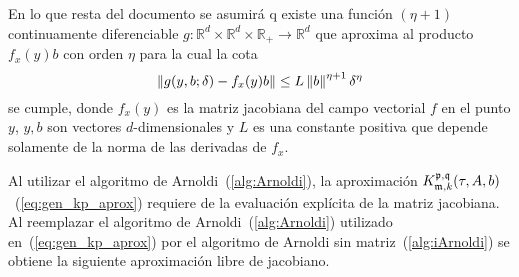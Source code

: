 En lo que resta del documento se asumirá q existe una función $(\eta+1)$ continuamente diferenciable $g: \mathbb{R}^{d}\times \mathbb{R}^{d} \times \mathbb{R}_+ \to \mathbb{R}^{d}$ que aproxima al producto $f_x(y)b$ con orden $\eta$ para la cual la cota
\begin{equation} \label{eq:g_bound}
	\left\lVert g(y,b;\delta)-f_x(y)b \right\rVert \leq L\left\lVert b \right\rVert^{\eta+1}\delta^{\eta}
\end{equation}
se cumple, donde $f_x(y)$ es la matriz jacobiana del campo vectorial $f$ en el punto $y$, $y,b$ son vectores $d$-dimensionales y $L$ es una constante positiva que depende solamente de la norma de las derivadas de $f_x$.



Al utilizar el algoritmo de Arnoldi~(\ref{alg:Arnoldi}), la aproximación $K_{\mathfrak{m},k}^{\mathfrak{p},\mathfrak{q}}(\tau,A,b)$~(\ref{eq:gen_kp_aprox}) requiere de la evaluación explícita de la matriz jacobiana. Al reemplazar el algoritmo de Arnoldi~(\ref{alg:Arnoldi}) utilizado en~(\ref{eq:gen_kp_aprox}) por el algoritmo de Arnoldi sin matriz~(\ref{alg:iArnoldi}) se obtiene la siguiente aproximación libre de jacobiano.

